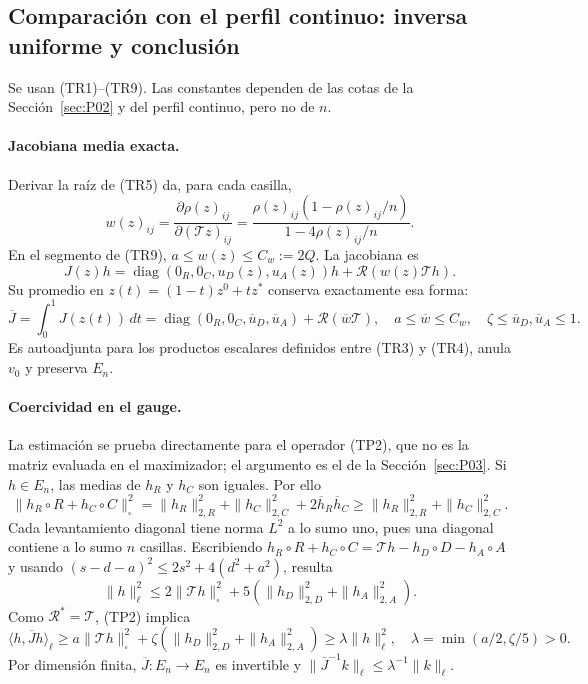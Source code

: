 \subsection{Comparación con el perfil continuo: inversa uniforme y conclusión}\label{sec:P06}
Se usan (TR1)--(TR9). Las constantes dependen de las cotas de la Sección~\ref{sec:P02} y
del perfil continuo, pero no de $n$.

\paragraph{Jacobiana media exacta.}
Derivar la raíz de (TR5) da, para cada casilla,
\[
 w(z)_{ij}=\frac{\partial\rho(z)_{ij}}{\partial(\mathcal Tz)_{ij}}
 =\frac{\rho(z)_{ij}(1-\rho(z)_{ij}/n)}{1-4\rho(z)_{ij}/n}.
\]
En el segmento de (TR9), $a\le w(z)\le C_w:=2Q$. La jacobiana es
\[
 J(z)h=\operatorname{diag}(0_R,0_C,u_D(z),u_A(z))h
                         +\mathcal R(w(z)\mathcal T h).
                                                        \tag{TP1}
\]
Su promedio en $z(t)=(1-t)z^0+tz^*$ conserva exactamente esa forma:
\[
 \overline J=\int_0^1J(z(t))\,dt
 =\operatorname{diag}(0_R,0_C,\overline u_D,\overline u_A)
                              +\mathcal R(\overline w\mathcal T),
 \quad a\le\overline w\le C_w,\quad\zeta\le\overline u_D,\overline u_A\le1.
                                                        \tag{TP2}
\]
Es autoadjunta para los productos escalares definidos entre (TR3) y (TR4), anula $v_0$ y
preserva $E_n$.

\paragraph{Coercividad en el gauge.}
La estimación se prueba directamente para el operador (TP2), que no es la matriz evaluada en el
maximizador; el argumento es el de la Sección~\ref{sec:P03}.
Si $h\in E_n$, las medias de $h_R$ y $h_C$ son iguales. Por ello
\[
 \|h_R\circ R+h_C\circ C\|_\square^2
 =\|h_R\|_{2,R}^2+\|h_C\|_{2,C}^2+2\overline h_R\overline h_C
 \ge\|h_R\|_{2,R}^2+\|h_C\|_{2,C}^2.
\]
Cada levantamiento diagonal tiene norma $L^2$ a lo sumo uno, pues
una diagonal contiene a lo sumo $n$ casillas. Escribiendo
$h_R\circ R+h_C\circ C=\mathcal T h-h_D\circ D-h_A\circ A$
y usando $(s-d-a)^2\le2s^2+4(d^2+a^2)$, resulta
\[
 \|h\|_\ell^2\le2\|\mathcal T h\|_\square^2
                    +5(\|h_D\|_{2,D}^2+\|h_A\|_{2,A}^2).
\]
Como $\mathcal R^*=\mathcal T$, (TP2) implica
\[
 \langle h,\overline Jh\rangle_\ell
 \ge a\|\mathcal T h\|_\square^2
             +\zeta(\|h_D\|_{2,D}^2+\|h_A\|_{2,A}^2)
 \ge\lambda\|h\|_\ell^2,
 \quad\lambda=\min(a/2,\zeta/5)>0.
                                                        \tag{TP3}
\]
Por dimensión finita, $\overline J:E_n\to E_n$ es invertible y
$\|\overline J^{-1}k\|_\ell\le\lambda^{-1}\|k\|_\ell$.

